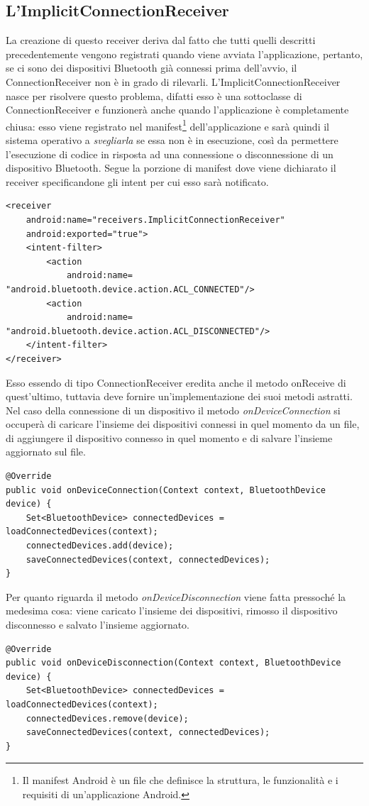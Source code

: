 \subsection{L'ImplicitConnectionReceiver}
La creazione di questo receiver deriva dal fatto che tutti quelli descritti precedentemente vengono registrati quando viene avviata l'applicazione, pertanto, se ci sono dei dispositivi Bluetooth già connessi prima dell'avvio, il ConnectionReceiver non è in grado di rilevarli. L'ImplicitConnectionReceiver nasce per risolvere questo problema, difatti esso è una sottoclasse di ConnectionReceiver e funzionerà anche quando l'applicazione è completamente chiusa: esso viene registrato nel manifest\footnote{Il manifest Android è un file che definisce la struttura, le funzionalità e i requisiti di un'applicazione Android.} dell'applicazione e sarà quindi il sistema operativo a \textit{svegliarla} se essa non è in esecuzione, così da permettere l'esecuzione di codice in risposta ad una connessione o disconnessione di un dispositivo Bluetooth. Segue la porzione di manifest dove viene dichiarato il receiver specificandone gli intent per cui esso sarà notificato.
\begin{verbatim}
<receiver 
    android:name="receivers.ImplicitConnectionReceiver"
    android:exported="true">
    <intent-filter>
        <action 
            android:name= "android.bluetooth.device.action.ACL_CONNECTED"/>
        <action
            android:name= "android.bluetooth.device.action.ACL_DISCONNECTED"/>
    </intent-filter>
</receiver>
\end{verbatim}

Esso essendo di tipo ConnectionReceiver eredita anche il metodo onReceive di quest'ultimo, tuttavia deve fornire un'implementazione dei suoi metodi astratti. Nel caso della connessione di un dispositivo il metodo \textit{onDeviceConnection} si occuperà di caricare l'insieme dei dispositivi connessi in quel momento da un file, di aggiungere il dispositivo connesso in quel momento e di salvare l'insieme aggiornato sul file.
\begin{verbatim}
@Override
public void onDeviceConnection(Context context, BluetoothDevice device) {
    Set<BluetoothDevice> connectedDevices = loadConnectedDevices(context);
    connectedDevices.add(device);
    saveConnectedDevices(context, connectedDevices);
}
\end{verbatim}

Per quanto riguarda il metodo \textit{onDeviceDisconnection} viene fatta pressoché la medesima cosa: viene caricato l'insieme dei dispositivi, rimosso il dispositivo disconnesso e salvato l'insieme aggiornato.
\begin{verbatim}
@Override
public void onDeviceDisconnection(Context context, BluetoothDevice device) {
    Set<BluetoothDevice> connectedDevices = loadConnectedDevices(context);
    connectedDevices.remove(device);
    saveConnectedDevices(context, connectedDevices);
}
\end{verbatim}

